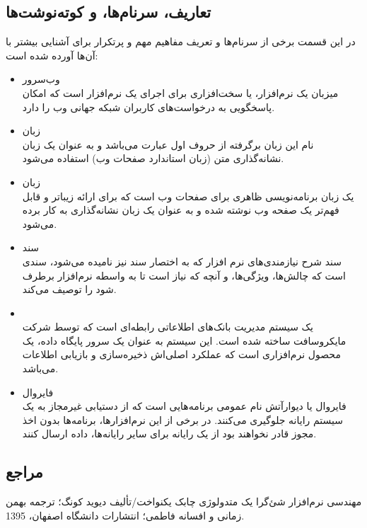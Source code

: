\documentclass{report}
\begin{document}
\subsection{ تعاریف، سرنام‌ها، و کوته‌نوشت‌ها }
  در این قسمت برخی از سرنام‌ها و تعریف مفاهیم مهم و پرتکرار برای آشنایی بیشتر با آن‌ها  آورده شده است:
  \begin{itemize}
  \item
وب‌سرور
\\
   میزبان یک نرم‌افزار، یا سخت‌افزاری برای اجرای یک نرم‌افزار است که امکان پاسخگویی به درخواست‌های کاربران شبکه جهانی وب را دارد.

\item
زبان 
\\
 نام این زبان برگرفته از حروف اول عبارت 
  می‌باشد و به عنوان یک زبان نشانه‌گذاری متن (زبان استاندارد صفحات وب) استفاده می‌شود.

\item
زبان 
\\
یک زبان برنامه‌نویسی ظاهری برای صفحات وب است که برای ارائه زیباتر و قابل فهم‌تر یک صفحه وب نوشته شده و به عنوان یک زبان نشانه‌گذاری به کار برده می‌شود.


\item
سند
\\
سند شرح نیازمندی‌های نرم افزار که به اختصار سند
 نیز نامیده می‌شود، سندی است که چالش‌ها، ویژگی‌ها، و آنچه که نیاز است تا به واسطه نرم‌افزار برطرف شود را توصیف می‌کند.

\item
{}
\\
یک سیستم مدیریت بانک‌های اطلاعاتی رابطه‌ای است که توسط شرکت مایکروسافت ساخته شده‌ است. این سیستم به عنوان یک سرور پایگاه داده، یک محصول نرم‌افزاری است که عملکرد اصلی‌اش ذخیره‌سازی و بازیابی اطلاعات می‌باشد.





\item
فایروال
 \\
فایروال یا دیوارآتش نام عمومی برنامه‌هایی است که از دستیابی غیرمجاز به یک سیستم رایانه جلوگیری می‌کنند. در برخی از این نرم‌افزارها، برنامه‌ها بدون اخذ مجوز قادر نخواهند بود از یک رایانه برای سایر رایانه‌ها، داده ارسال کنند.


  \end{itemize}
\subsection{مراجع}
   مهندسی نرم‌افزار شئ‌گرا یک متدولوژی چابک یکنواخت/تألیف دیوید کونگ؛ ترجمه بهمن زمانی و افسانه فاطمی؛ انتشارات دانشگاه اصفهان، 1395.
\end{document}
